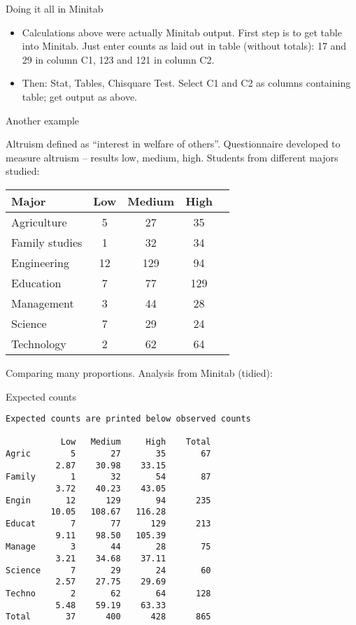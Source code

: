 \begin{slide}{Doing it all in Minitab}
  \begin{itemize}
  \item 
Calculations above were actually Minitab output. First step is to get
table into Minitab. Just enter counts as laid out in table (without
totals): 17 and 29 in column C1, 123 and 121 in column C2.

\item Then: Stat, Tables, Chisquare Test. Select C1 and C2 as columns
containing table; get output as above.

  \end{itemize}
\end{slide}

\begin{slide}{Another example}

Altruism defined as ``interest in welfare of others''. Questionnaire
developed to measure altruism -- results low, medium, high. Students
from different majors studied:

\begin{tabular}{lcccc}
\hline
Major & Low & Medium & High\\
\hline
Agriculture & 5 & 27 & 35\\
Family studies & 1 & 32 & 34\\
Engineering & 12 & 129 & 94\\
Education & 7 & 77 & 129\\
Management & 3 & 44 & 28\\
Science & 7 & 29 & 24\\
Technology & 2 & 62 & 64\\
\hline
\end{tabular}

Comparing many proportions. Analysis from Minitab (tidied):

\end{slide}
\begin{slide}{Expected counts}

\footnotesize
\begin{verbatim}
Expected counts are printed below observed counts

           Low   Medium     High    Total
Agric        5       27       35       67
          2.87    30.98    33.15
Family       1       32       54       87
          3.72    40.23    43.05
Engin       12      129       94      235
         10.05   108.67   116.28
Educat       7       77      129      213
          9.11    98.50   105.39
Manage       3       44       28       75
          3.21    34.68    37.11
Science      7       29       24       60
          2.57    27.75    29.69
Techno       2       62       64      128
          5.48    59.19    63.33
Total       37      400      428      865
\end{verbatim}
\end{slide}
